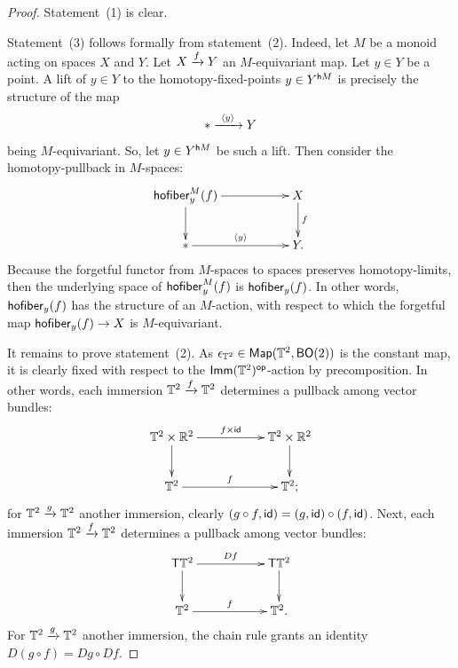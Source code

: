 \begin{proof}
Statement~(1) is clear.

Statement~(3) follows formally from statement~(2).  
Indeed, let $M$ be a monoid acting on spaces $X$ and $Y$.
Let $X\xrightarrow{f} Y$ an $M$-equivariant map.
Let $y\in Y$ be a point.
A lift of $y \in Y$ to the homotopy-fixed-points $y  \in Y^{{\sf h}M}$ is precisely the structure of the map
\[
\ast
\xrightarrow{~\langle y  \rangle~}
Y
\]
being $M$-equivariant.  
So, let $y\in Y^{{\sf h}M}$ be such a lift.
Then consider the homotopy-pullback in $M$-spaces:
\[
\xymatrix{
{\sf hofiber}^M_{y}(f)
\ar[rr]
\ar[d]
&&
X
\ar[d]^-f
\\
\ast
\ar[rr]^-{\lag y \rag}
&&
Y
.
}
\]
Because the forgetful functor from $M$-spaces to spaces preserves homotopy-limits, then the underlying space of ${\sf hofiber}^M_{y}(f)$ is ${\sf hofiber}_{y}(f)$.
In other words, ${\sf hofiber}_{y}(f)$ has the structure of an $M$-action, with respect to which the forgetful map ${\sf hofiber}_{y}(f) \to X$ is $M$-equivariant.


It remains to prove statement~(2).
As $\epsilon_{\mathbb T^2} \in \operatorname{{\sf Map}}( \mathbb T^2 , {\sf BO}(2))$ is the constant map, it is clearly fixed with respect to the $\operatorname{\sf Imm}(\mathbb T^2)^{\operatorname{\mathsf{op}}}$-action by precomposition.
In other words, each immersion $\mathbb T^2 \xrightarrow{f} \mathbb T^2$ determines a pullback among vector bundles:
\[
\xymatrix{
\TT^2 \times \RR^2
\ar[rr]^-{f \times \id}
\ar[d]
&&
\TT^2 \times \RR^2
\ar[d]
\\
\TT^2
\ar[rr]^-f
&&
\TT^2
;
}
\]
for $\mathbb T^2 \xrightarrow{g} \mathbb T^2$ another immersion, clearly $(g \circ f , \operatorname{\sf id}) = ( g , \operatorname{\sf id}) \circ (f , \operatorname{\sf id})$.
Next, each immersion $\mathbb T^2 \xrightarrow{f} \mathbb T^2$
determines a pullback among vector bundles:
\[
\xymatrix{
\sT \TT^2 
\ar[rr]^-{Df}
\ar[d]
&&
\sT \TT^2
\ar[d]
\\
\TT^2
\ar[rr]^-f
&&
\TT^2
.
}
\]
For $\mathbb T^2 \xrightarrow{g} \mathbb T^2$ another immersion, the chain rule grants an identity $D (g \circ f) = D g \circ Df$.



\end{proof}






